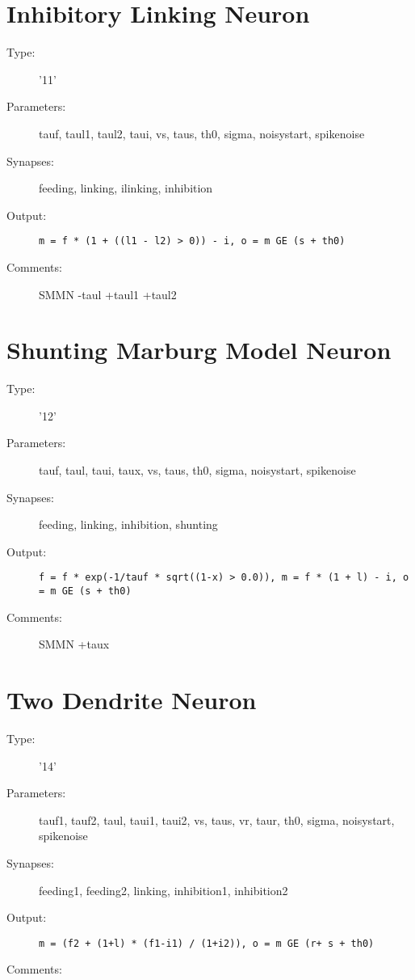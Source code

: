 \documentclass[12pt]{article}
\begin{document}
\section{Inhibitory Linking Neuron}
\begin{description}
\item[Type:] '11'

\item[Parameters:] tauf, taul1, taul2, taui, vs, taus, th0, sigma, noisystart, 
              spikenoise

\item[Synapses:] feeding, linking, ilinking, inhibition

\item[Output:] \texttt{m = f * (1 + ((l1 - l2) > 0)) - i, o = m GE (s + th0)}

\item[Comments:] SMMN -taul +taul1 +taul2 
\end{description}



\section{Shunting Marburg Model Neuron}
\begin{description}
\item[Type:] '12'

\item[Parameters:] tauf, taul, taui, taux, vs, taus, th0, sigma, noisystart, 
              spikenoise

\item[Synapses:] feeding, linking, inhibition, shunting

\item[Output:] \texttt{f = f * exp(-1/tauf * sqrt((1-x) > 0.0)), m = f * (1 + l) - i, o = m GE (s + th0)}

\item[Comments:] SMMN +taux 
\end{description}



\section{Two Dendrite Neuron}
\begin{description}
\item[Type:] '14'

\item[Parameters:] tauf1, tauf2, taul, taui1, taui2, vs, taus, vr,
                   taur, th0, sigma, noisystart, spikenoise

\item[Synapses:] feeding1, feeding2, linking, inhibition1, inhibition2

\item[Output:] \texttt{m = (f2 + (1+l) * (f1-i1) / (1+i2)), o = m GE (r+ s + th0)}

\item[Comments:] 
\end{description}
\end{document}
